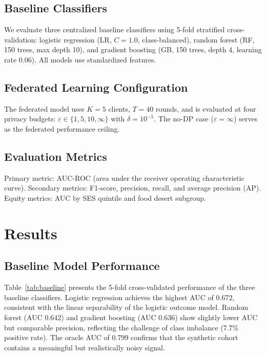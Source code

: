 \documentclass[journal]{IEEEtran}
\newcommand{\eps}{\varepsilon}
\begin{document}
\subsection{Baseline Classifiers}

We evaluate three centralized baseline classifiers using 5-fold
stratified cross-validation: logistic regression (LR, $C=1.0$,
class-balanced), random forest (RF, 150 trees, max depth 10), and
gradient boosting (GB, 150 trees, depth 4, learning rate 0.06).
All models use standardized features.

\subsection{Federated Learning Configuration}

The federated model uses $K=5$ clients, $T=40$ rounds, and is
evaluated at four privacy budgets: $\eps \in \{1, 5, 10, \infty\}$
with $\delta=10^{-5}$. The no-DP case ($\eps=\infty$) serves as
the federated performance ceiling.

\subsection{Evaluation Metrics}

Primary metric: AUC-ROC (area under the receiver operating
characteristic curve). Secondary metrics: F1-score, precision,
recall, and average precision (AP). Equity metrics: AUC by SES
quintile and food desert subgroup.

\section{Results}
\label{sec:results}

\subsection{Baseline Model Performance}

Table~\ref{tab:baseline} presents the 5-fold cross-validated
performance of the three baseline classifiers. Logistic regression
achieves the highest AUC of 0.672, consistent with the linear
separability of the logistic outcome model. Random forest (AUC
0.642) and gradient boosting (AUC 0.636) show slightly lower AUC
but comparable precision, reflecting the challenge of class
imbalance (7.7\% positive rate). The oracle AUC of 0.799 confirms
that the synthetic cohort contains a meaningful but realistically
noisy signal.
\end{document}
